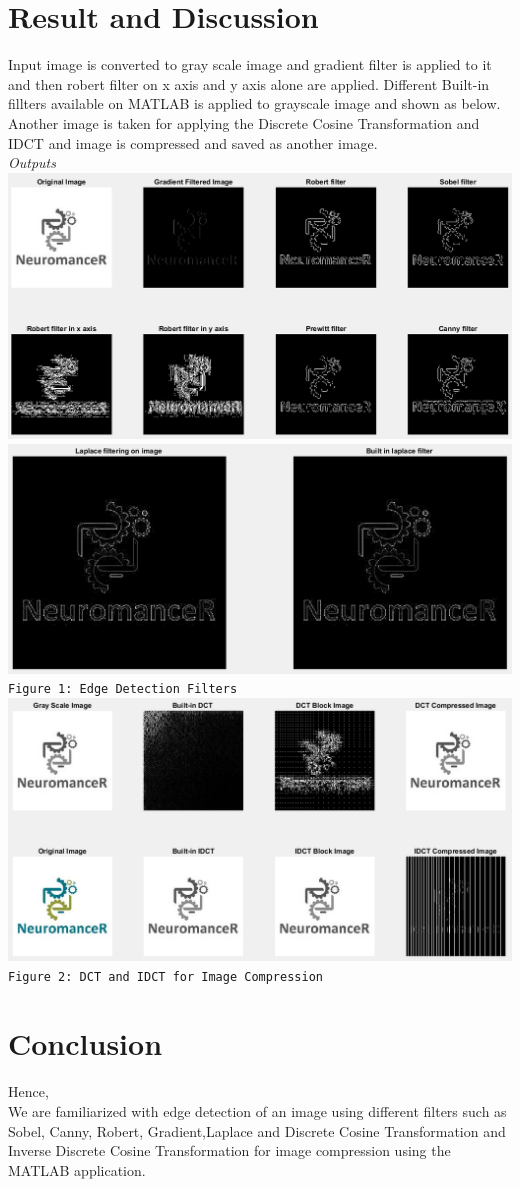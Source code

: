 \documentclass[12pt]{article}
\begin{document}
\section{Result and Discussion}
Input image is converted to gray scale image and gradient filter is applied to it and then robert filter on x axis and y axis alone are applied. Different Built-in fillters available on MATLAB is applied to grayscale image and shown as below.\\
Another image is taken for applying the Discrete Cosine Transformation and IDCT and image is compressed and saved as another image.\\
\emph{Outputs}\\
\includegraphics[scale = 0.4]{output_labseven_1.png}
\includegraphics[scale = 0.2]{output_labseven_2.png}\\
\texttt{Figure 1:  Edge Detection Filters }\\

\includegraphics[scale = 0.4]{output_labseven_3.png}\\
\texttt{Figure 2: DCT and IDCT for Image Compression }\\

\pagebreak
\section{Conclusion}
Hence, \\
We are familiarized with edge detection of an image using different filters such as Sobel, Canny, Robert, Gradient,Laplace and Discrete Cosine Transformation and Inverse Discrete Cosine Transformation for image compression using the MATLAB application.
\end{document}
